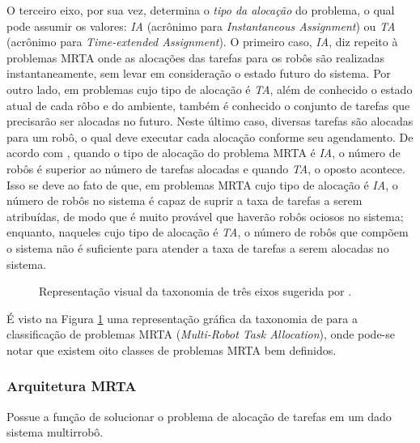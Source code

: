             O terceiro eixo, por sua vez, determina o \textit{tipo da alocação} do problema, o qual pode assumir os valores: \textit{IA} (acrônimo para \textit{Instantaneous Assignment}) ou \textit{TA} (acrônimo para \textit{Time-extended Assignment}). O primeiro caso, \textit{IA}, diz repeito à problemas MRTA onde as alocações das tarefas para os robôs são realizadas instantaneamente, sem levar em consideração o estado futuro do sistema. Por outro lado, em problemas cujo tipo de alocação é \textit{TA}, além de conhecido o estado atual de cada rôbo e do ambiente, também é conhecido o conjunto de tarefas que precisarão ser alocadas no futuro. Neste último caso, diversas tarefas são alocadas para um robô, o qual deve executar cada alocação conforme seu agendamento. De acordo com \cite{ref:bastos2008utility}, quando o tipo de alocação do problema MRTA é \textit{IA}, o número de robôs é superior ao número de tarefas alocadas e quando \textit{TA}, o oposto acontece. Isso se deve ao fato de que, em problemas MRTA cujo tipo de alocação é \textit{IA}, o número de robôs no sistema é capaz de suprir a taxa de tarefas a serem atribuídas, de modo que é muito provável que haverão robôs ociosos no sistema; enquanto, naqueles cujo tipo de alocação é \textit{TA}, o número de robôs que compõem o sistema não é suficiente para atender a taxa de tarefas a serem alocadas no sistema.
            
            \begin{figure}[htb]
                \centering
                
                \caption[Representação visual da taxonomia de três eixos]{Representação visual da taxonomia de três eixos sugerida por .} \label{fig:taxomia_mrta}
            \end{figure}
            
            É visto na Figura \ref{fig:taxomia_mrta} uma representação gráfica da taxonomia de \cite{ref:gerkey2004taxonomy} para a classificação de problemas MRTA (\textit{Multi-Robot Task Allocation}), onde pode-se notar que existem oito classes de problemas MRTA bem definidos.
            
        \subsubsection{Arquitetura MRTA} \label{subsec:arquiteturas_mrta}
            Possue a função de solucionar o problema de alocação de tarefas em um dado sistema multirrobô.
            
